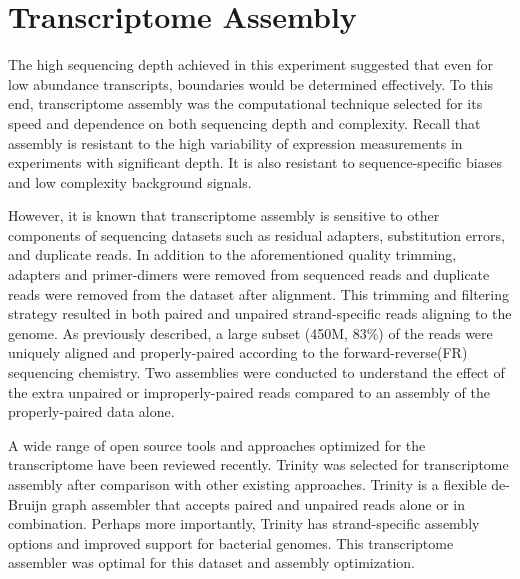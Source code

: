 

\chapter{Transcriptome Assembly}
The high sequencing depth achieved in this experiment suggested that even for low abundance transcripts, boundaries would be determined effectively. To this end, transcriptome assembly was the computational technique selected for its speed and dependence on both sequencing depth and complexity.\cite{108} Recall that assembly is resistant to the high variability of expression measurements in experiments with significant depth. It is also resistant to sequence-specific biases and low complexity background signals. 

However, it is known that transcriptome assembly is sensitive to other components of sequencing datasets such as residual adapters, substitution errors, and duplicate reads.\cite{108} In addition to the aforementioned quality trimming, adapters and primer-dimers were removed from sequenced reads and duplicate reads were removed from the dataset after alignment. This trimming and filtering strategy resulted in both paired and unpaired strand-specific reads aligning to the genome. As previously described, a large subset (450M, 83\%) of the reads were uniquely aligned and properly-paired according to the forward-reverse(FR) sequencing chemistry. Two assemblies were conducted to understand the effect of the extra unpaired or improperly-paired reads compared to an assembly of the properly-paired data alone.

A wide range of open source tools and approaches optimized for the transcriptome have been reviewed recently.\cite{108} Trinity was selected for transcriptome assembly after comparison with other existing approaches. Trinity\cite{58} is a flexible de-Bruijn graph assembler that accepts paired and unpaired reads alone or in combination. Perhaps more importantly, Trinity has strand-specific assembly options and improved support for bacterial genomes. This transcriptome assembler was optimal for this dataset and assembly optimization.







